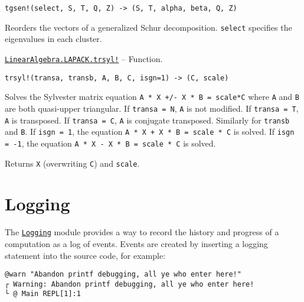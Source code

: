 \begin{adjustwidth}{2em}{0pt}


\begin{verbatim}
tgsen!(select, S, T, Q, Z) -> (S, T, alpha, beta, Q, Z)
\end{verbatim}

Reorders the vectors of a generalized Schur decomposition. \texttt{select} specifies the eigenvalues in each cluster.



\end{adjustwidth}
\hypertarget{853281004697696312}{} 
\hyperlink{853281004697696312}{\texttt{LinearAlgebra.LAPACK.trsyl!}}  -- {Function.}

\begin{adjustwidth}{2em}{0pt}


\begin{verbatim}
trsyl!(transa, transb, A, B, C, isgn=1) -> (C, scale)
\end{verbatim}

Solves the Sylvester matrix equation \texttt{A * X +/- X * B = scale*C} where \texttt{A} and \texttt{B} are both quasi-upper triangular. If \texttt{transa = N}, \texttt{A} is not modified. If \texttt{transa = T}, \texttt{A} is transposed. If \texttt{transa = C}, \texttt{A} is conjugate transposed. Similarly for \texttt{transb} and \texttt{B}. If \texttt{isgn = 1}, the equation \texttt{A * X + X * B = scale * C} is solved. If \texttt{isgn = -1}, the equation \texttt{A * X - X * B = scale * C} is solved.

Returns \texttt{X} (overwriting \texttt{C}) and \texttt{scale}.



\end{adjustwidth}



\hypertarget{10954107756881793102}{}


\chapter{Logging}



The \hyperlink{1488091939099076420}{\texttt{Logging}} module provides a way to record the history and progress of a computation as a log of events.  Events are created by inserting a logging statement into the source code, for example:




\begin{verbatim}
@warn "Abandon printf debugging, all ye who enter here!"
┌ Warning: Abandon printf debugging, all ye who enter here!
└ @ Main REPL[1]:1
\end{verbatim}



